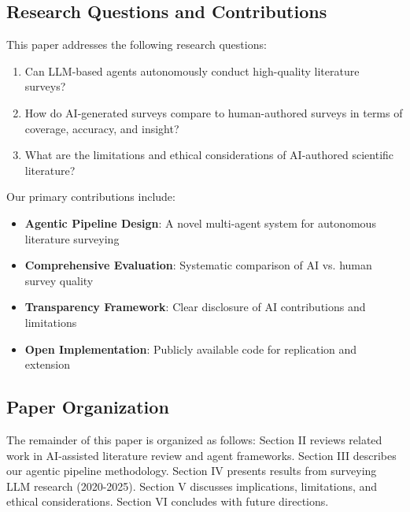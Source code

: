 \subsection{Research Questions and Contributions}

This paper addresses the following research questions:

\begin{enumerate}
    \item Can LLM-based agents autonomously conduct high-quality literature surveys?
    \item How do AI-generated surveys compare to human-authored surveys in terms of coverage, accuracy, and insight?
    \item What are the limitations and ethical considerations of AI-authored scientific literature?
\end{enumerate}

Our primary contributions include:

\begin{itemize}
    \item \textbf{Agentic Pipeline Design}: A novel multi-agent system for autonomous literature surveying
    \item \textbf{Comprehensive Evaluation}: Systematic comparison of AI vs. human survey quality
    \item \textbf{Transparency Framework}: Clear disclosure of AI contributions and limitations
    \item \textbf{Open Implementation}: Publicly available code for replication and extension
\end{itemize}

\subsection{Paper Organization}

The remainder of this paper is organized as follows: Section II reviews related work in AI-assisted literature review and agent frameworks. Section III describes our agentic pipeline methodology. Section IV presents results from surveying LLM research (2020-2025). Section V discusses implications, limitations, and ethical considerations. Section VI concludes with future directions.
